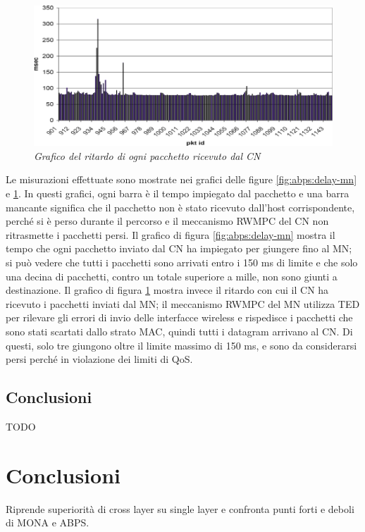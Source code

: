 \documentclass[12pt,a4paper,openright,twoside,draft]{book}
\begin{document}
\begin{figure}
  \centering
  \includegraphics[width=\textwidth]{img/abps-delay-cn}
  \caption{\em Grafico del ritardo di ogni pacchetto ricevuto dal CN}
  \label{fig:abps:delay-cn}
\end{figure}

Le misurazioni effettuate sono mostrate nei grafici delle figure
\ref{fig:abps:delay-mn} e \ref{fig:abps:delay-cn}. In questi grafici,
ogni barra è il tempo impiegato dal pacchetto e una barra mancante
significa che il pacchetto non è stato ricevuto dall'host
corrispondente, perché si è perso durante il percorso e il meccanismo
RWMPC del CN non ritrasmette i pacchetti persi. Il grafico di figura
\ref{fig:abps:delay-mn} mostra il tempo che ogni pacchetto inviato dal
CN ha impiegato per giungere fino al MN; si può vedere che tutti i
pacchetti sono arrivati entro i 150 ms di limite e che solo una decina
di pacchetti, contro un totale superiore a mille, non sono giunti a
destinazione. Il grafico di figura \ref{fig:abps:delay-cn} mostra
invece il ritardo con cui il CN ha ricevuto i pacchetti inviati dal
MN; il meccanismo RWMPC del MN utilizza TED per rilevare gli errori di
invio delle interfacce wireless e rispedisce i pacchetti che sono
stati scartati dallo strato MAC, quindi tutti i datagram arrivano al
CN. Di questi, solo tre giungono oltre il limite massimo di 150 ms, e
sono da considerarsi persi perché in violazione dei limiti di QoS.

\section{Conclusioni}

TODO

\clearpage{\pagestyle{empty}\cleardoublepage}


\chapter{Conclusioni}
Riprende superiorità di cross layer su single layer e confronta punti
forti e deboli di MONA e ABPS.
\end{document}
